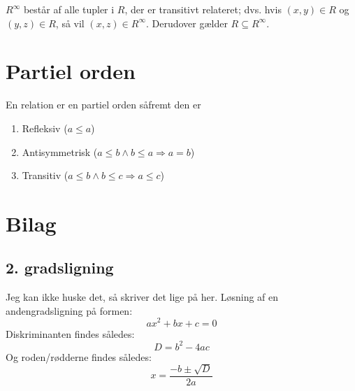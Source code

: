 \documentclass[a4paper]{article}
\begin{document}
$R^\infty$ består af alle tupler i $R$, der er transitivt relateret; dvs. hvis $(x, y) \in R$
og $(y, z) \in R$, så vil $(x, z) \in R^\infty$. Derudover gælder $R \subseteq R^\infty$.

\section{Partiel orden}

En relation er en partiel orden såfremt den er
\begin{enumerate}
\item Refleksiv ($a \leq a$)
\item Antisymmetrisk ($a \leq b \wedge b \leq a \Rightarrow a = b$)
\item Transitiv ($a \leq b \wedge b \leq c \Rightarrow a \leq c$)
\end{enumerate}

\section{Bilag}
  \subsection{2. gradsligning}
  Jeg kan ikke huske det, så skriver det lige på her. Løsning af en andengradsligning på formen:
  \begin{equation}
    ax^2+bx+c=0
  \end{equation}
  Diskriminanten findes således:
  \begin{equation}
    D=b^2-4ac
  \end{equation}
  Og roden/rødderne findes således:
  \begin{equation}
    x = \frac{-b\pm \sqrt{D}}{2a}
  \end{equation}
\end{document}
